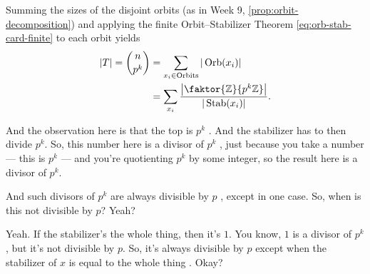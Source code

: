 \begin{proofWrapper}
\begin{content}
Summing the sizes of the disjoint orbits (as in Week 9, \cref{prop:orbit-decomposition}) and applying the finite Orbit--Stabilizer Theorem \eqref{eq:orb-stab-card-finite} to each orbit yields
\begin{align}
|T| = \binom{n}{p^k} &= \sum_{x_i \in \text{Orbits}} |\operatorname{Orb}(x_i)| \nonumber \\
&= \sum_{x_i} \frac{\left|\faktor{\mathbb{Z}}{p^k\mathbb{Z}}\right|}{|\operatorname{Stab}(x_i)|}. \label{eq:orbit-sum-stabilizer}
\end{align}
\end{content}

\begin{hidden}
\end{hidden}

\begin{speech}[00:40:58 - 00:41:53]
And the observation here is that the top is $p^k$ . And the stabilizer has to then divide $p^k$. So, this number here  is a divisor of $p^k$ , just because you take a number --- this is $p^k$ --- and you're quotienting $p^k$ by some integer, so the result here is a divisor of $p^k$.

And such divisors of $p^k$ are always divisible by $p$ , except in one case. So, when is this not divisible by $p$? Yeah?
\end{speech}

\begin{speech}[00:41:53 - 00:42:32]
 Yeah. If the stabilizer's the whole thing, then it's $1$. You know, $1$ is a divisor of $p^k$, but it's not divisible by $p$. So, it's always divisible by $p$ except when the stabilizer of $x$ is equal to the whole thing . Okay?


\end{speech}
\end{proofWrapper}
